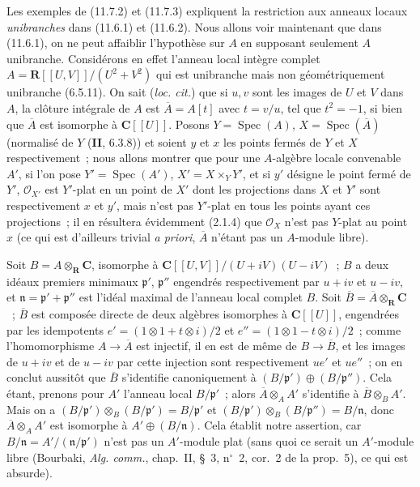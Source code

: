 \begin{env}[11.7.5]
\label{IV.11.7.5-fr}
Les exemples de (11.7.2) et (11.7.3) expliquent la restriction aux anneaux
locaux \emph{unibranches} dans (11.6.1) et (11.6.2). Nous allons voir maintenant
que dans (11.6.1), on ne peut affaiblir l'hypothèse sur $A$ en supposant
seulement $A$ unibranche. Considérons en effet l'anneau local intègre complet
$A=\mathbf R[[U,V]]/(U^2+V^2)$ qui est unibranche mais non géométriquement
unibranche (6.5.11). On sait (\emph{loc. cit.}) que si $u,v$ sont les images de
$U$ et $V$ dans $A$, la clôture intégrale de $A$ est $\overline A=A[t]$ avec
$t=v/u$, tel que $t^2=-1$, si bien que $\overline A$ est isomorphe à
$\mathbf C[[U]]$. Posons $Y=\operatorname{Spec}(A)$,
$X=\operatorname{Spec}(\overline A)$ (normalisé de $Y$ (\textbf{II}, 6.3.8)) et
soient $y$ et $x$ les points fermés de $Y$ et $X$ respectivement~; nous allons
montrer que pour une $A$-algèbre locale convenable $A'$, si l'on pose
$Y'=\operatorname{Spec}(A')$, $X'=X\times_Y Y'$, et si $y'$ désigne le point
fermé de $Y'$, $\mathcal O_{X'}$ est $Y'$-plat en un point de $X'$ dont les
projections dans $X$ et $Y'$ sont respectivement $x$ et $y'$, mais n'est pas
$Y'$-plat en tous les points ayant ces projections~; il en résultera évidemment
(2.1.4) que $\mathcal O_X$ n'est pas $Y$-plat au point $x$ (ce qui est d'ailleurs
trivial \emph{a priori}, $\overline A$ n'étant pas un $A$-module libre).

Soit $B=A\otimes_{\mathbf R}\mathbf C$, isomorphe à
$\mathbf C[[U,V]]/(U+iV)(U-iV)$~; $B$ a deux idéaux premiers minimaux
$\mathfrak p'$, $\mathfrak p''$ engendrés respectivement par $u+iv$ et $u-iv$,
et $\mathfrak n=\mathfrak p'+\mathfrak p''$ est l'idéal maximal de l'anneau
local complet $B$. Soit $\overline B=\overline A\otimes_{\mathbf R}\mathbf C$~;
$\overline B$ est composée directe de deux algèbres isomorphes à
$\mathbf C[[U]]$, engendrées par les idempotents
$e'=(1\otimes1+t\otimes i)/2$ et $e''=(1\otimes1-t\otimes i)/2$~; comme
l'homomorphisme $A\to\overline A$ est injectif, il en est de même de
$B\to\overline B$, et les images de $u+iv$ et de $u-iv$ par cette injection sont
respectivement $ue'$ et $ue''$~; on en conclut aussitôt que $\overline B$
s'identifie canoniquement à $(B/\mathfrak p')\oplus(B/\mathfrak p'')$. Cela
étant, prenons pour $A'$ l'anneau local $B/\mathfrak p'$~; alors
$\overline A\otimes_A A'$ s'identifie à $\overline B\otimes_B A'$. Mais on a
$(B/\mathfrak p')\otimes_B(B/\mathfrak p')=B/\mathfrak p'$ et
$(B/\mathfrak p')\otimes_B(B/\mathfrak p'')=B/\mathfrak n$, donc
$\overline A\otimes_A A'$ est isomorphe à $A'\oplus(B/\mathfrak n)$. Cela
établit notre assertion, car $B/\mathfrak n=A'/(\mathfrak n/\mathfrak p')$
n'est pas un $A'$-module plat (sans quoi ce serait un $A'$-module libre
(Bourbaki, \emph{Alg. comm.}, chap.~II, \S~3, n$^\circ$~2, cor.~2 de la
prop.~5), ce qui est absurde).
\end{env}

